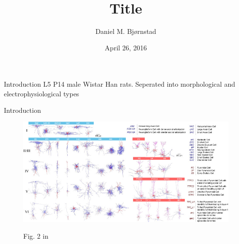 \documentclass{beamer}
\title[Short title] %
{Title}
\author %
{Daniel M. Bj\o rnstad}
\date{April 26, 2016}
\institute
{
    CINPLA - Weekly Meeting
}
\begin{document}
\begin{frame}
  \titlepage
\end{frame}






\begin{frame}{Introduction}
    L5 P14 male Wistar Han rats. Seperated into morphological and 
    electrophysiological types
\end{frame}

\begin{frame}{Introduction}
    \begin{figure}
        \centering
        \includegraphics[width=\textwidth]{images/m-types.jpg}\\
        \caption*{\centering Fig. 2 in \textcite{markram_reconstruction_2015}}
    \end{figure}
\end{frame}
\end{document}
